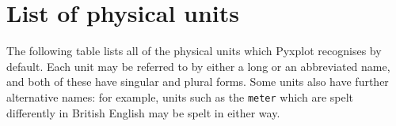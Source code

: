 %
%
%
%
%



\chapter{List of physical units}
\label{ch:unit_list}

The following table lists all of the physical units which Pyxplot recognises by
default. Each unit may be referred to by either a long or an abbreviated name,
and both of these have singular and plural forms. Some units also have further
alternative names: for example, units such as the {\tt meter} which are spelt
differently in British English may be spelt in either way.


